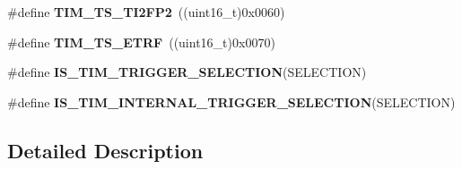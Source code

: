 \begin{DoxyCompactItemize}
\item 
\hypertarget{group___t_i_m___internal___trigger___selection_ga0ed58a269bccd3f22d19cc9a2ba3123f}{\#define {\bfseries T\-I\-M\-\_\-\-T\-S\-\_\-\-T\-I2\-F\-P2}~((uint16\-\_\-t)0x0060)}\label{group___t_i_m___internal___trigger___selection_ga0ed58a269bccd3f22d19cc9a2ba3123f}

\item 
\hypertarget{group___t_i_m___internal___trigger___selection_gaece08e02e056613a882aa7ff0a6ccc2d}{\#define {\bfseries T\-I\-M\-\_\-\-T\-S\-\_\-\-E\-T\-R\-F}~((uint16\-\_\-t)0x0070)}\label{group___t_i_m___internal___trigger___selection_gaece08e02e056613a882aa7ff0a6ccc2d}

\item 
\#define {\bfseries I\-S\-\_\-\-T\-I\-M\-\_\-\-T\-R\-I\-G\-G\-E\-R\-\_\-\-S\-E\-L\-E\-C\-T\-I\-O\-N}(S\-E\-L\-E\-C\-T\-I\-O\-N)
\item 
\#define {\bfseries I\-S\-\_\-\-T\-I\-M\-\_\-\-I\-N\-T\-E\-R\-N\-A\-L\-\_\-\-T\-R\-I\-G\-G\-E\-R\-\_\-\-S\-E\-L\-E\-C\-T\-I\-O\-N}(S\-E\-L\-E\-C\-T\-I\-O\-N)
\end{DoxyCompactItemize}


\subsection{Detailed Description}



